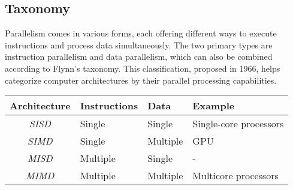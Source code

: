 \subsection{Taxonomy}
Parallelism comes in various forms, each offering different ways to execute instructions and process data simultaneously. 
The two primary types are instruction parallelism and data parallelism, which can also be combined according to Flynn's taxonomy. 
This classification, proposed in 1966, helps categorize computer architectures by their parallel processing capabilities.
\begin{table}[H]
    \centering
    \begin{tabular}{|c|lll|}
    \hline
    \multicolumn{1}{|l|}{\textbf{Architecture}} & \textbf{Instructions} & \textbf{Data} & \textbf{Example}       \\ \hline
    \textit{SISD}                               & Single                & Single        & Single-core processors \\ \hline
    \textit{SIMD}                               & Single                & Multiple      & GPU                    \\ \hline
    \textit{MISD}                               & Multiple              & Single        & -                      \\ \hline
    \textit{MIMD}                               & Multiple              & Multiple      & Multicore processors   \\ \hline
    \end{tabular}
\end{table}

